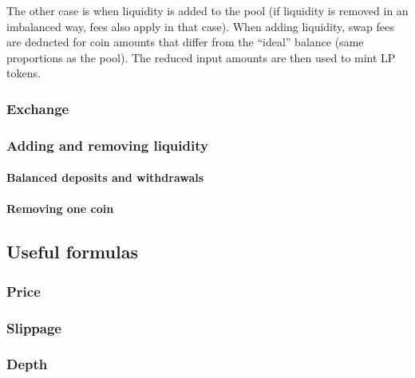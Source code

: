 \documentclass[
]{article}
\begin{document}
The other case is when liquidity is added to the pool (if liquidity is
removed in an imbalanced way, fees also apply in that case). When adding
liquidity, swap fees are deducted for coin amounts that differ from the
``ideal'' balance (same proportions as the pool). The reduced input
amounts are then used to mint LP tokens.

\hypertarget{exchange}{%
\subsubsection{Exchange}\label{exchange}}

\hypertarget{adding-and-removing-liquidity}{%
\subsubsection{Adding and removing
liquidity}\label{adding-and-removing-liquidity}}

\hypertarget{balanced-deposits-and-withdrawals}{%
\paragraph{Balanced deposits and
withdrawals}\label{balanced-deposits-and-withdrawals}}

\hypertarget{removing-one-coin}{%
\paragraph{Removing one coin}\label{removing-one-coin}}

\hypertarget{useful-formulas}{%
\subsection{Useful formulas}\label{useful-formulas}}

\hypertarget{price}{%
\subsubsection{Price}\label{price}}

\hypertarget{slippage}{%
\subsubsection{Slippage}\label{slippage}}

\hypertarget{depth}{%
\subsubsection{Depth}\label{depth}}
\end{document}
